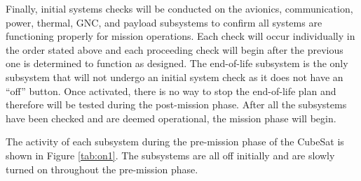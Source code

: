 Finally, initial systems checks will be conducted on the avionics, communication, power, thermal, GNC, and payload subsystems to confirm all systems are functioning properly for mission operations. Each check will occur individually in the order stated above and each proceeding check will begin after the previous one is determined to function as designed. The end-of-life subsystem is the only subsystem that will not undergo an initial system check as it does not have an “off” button.  Once activated, there is no way to stop the end-of-life plan and therefore will be tested during the post-mission phase. After all the subsystems have been checked and are deemed operational, the mission phase will begin. 

The activity of each subsystem during the pre-mission phase of the CubeSat is shown in Figure \ref{tab:on1}. The subsystems are all off initially and are slowly turned on throughout the pre-mission phase. 

